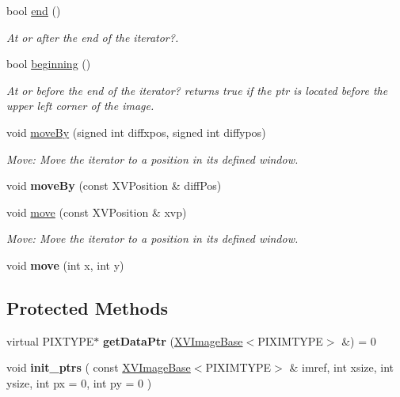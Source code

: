 \begin{CompactItemize}
bool \hyperlink{class_XVIterator_a16}{end} ()
\begin{CompactList}\small\item\em At or after the end of the iterator?.\item\end{CompactList}\item 
bool \hyperlink{class_XVIterator_a17}{beginning} ()
\begin{CompactList}\small\item\em At or before the end of the iterator? returns true if the ptr is located before the upper left corner of the image.\item\end{CompactList}\item 
void \hyperlink{class_XVIterator_a18}{move\-By} (signed int diffxpos, signed int diffypos)
\begin{CompactList}\small\item\em Move: Move the iterator to a position in its defined window.\item\end{CompactList}\item 
void {\bf move\-By} (const XVPosition \& diff\-Pos)
\item 
void \hyperlink{class_XVIterator_a20}{move} (const XVPosition \& xvp)
\begin{CompactList}\small\item\em Move: Move the iterator to a position in its defined window.\item\end{CompactList}\item 
void {\bf move} (int x, int y)
\end{CompactItemize}
\subsection*{Protected Methods}
\begin{CompactItemize}
\item 
\label{XVIterator_b0}
\hypertarget{class_XVIterator_b0}{
virtual PIXTYPE$\ast$ {\bf get\-Data\-Ptr} (\hyperlink{class_XVImageBase}{XVImage\-Base}$<$PIXIMTYPE$>$ \&) = 0}

\item 
void {\bf init\_\-ptrs} ( const \hyperlink{class_XVImageBase}{XVImage\-Base}$<$PIXIMTYPE$>$ \& imref, int xsize, int ysize, int px = 0, int py = 0 )
\end{CompactItemize}
